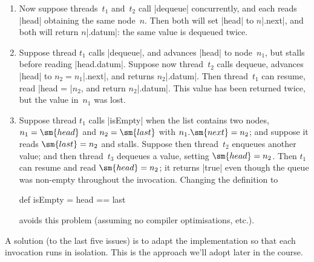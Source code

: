 \begin{answerI}
\begin{enumerate}

\item Now suppose threads~$t_1$ and~$t_2$ call |dequeue| concurrently, and
  each reads |head| obtaining the same node~$n$.  Then both will set |head| to
  $n$|.next|, and both will return $n$|.datum|: the same value is dequeued
  twice.


\item Suppose thread $t_1$ calls |dequeue|, and advances |head| to node~$n_1$,
  but stalls before reading |head.datum|.  Suppose now thread~$t_2$ calls
  dequeue, advances |head| to $n_2 = n_1$|.next|, and returns $n_2$|.datum|.
  Then thread~$t_1$ can resume, read |head = |$n_2$, and
  return $n_2$|.datum|.  This value has been returned twice, but the value
  in~$n_1$ was lost. 

\item Suppose thread $t_1$ calls |isEmpty| when the list contains two nodes,
  $n_1 = \sm{head}$ and $n_2 = \sm{last}$ with $n_1.\sm{next} = n_2$; and
  suppose it reads $\sm{last} = n_2$ and stalls.  Suppose then thread~$t_2$
  enqueues another value; and then thread~$t_3$ dequeues a value, setting
  $\sm{head} = n_2$.  Then $t_1$ can resume and read $\sm{head} = n_2$; it
  returns |true| even though the queue was non-empty throughout the
  invocation. 
%
  Changing the definition to
  \begin{scala}
  def isEmpty = head == last
  \end{scala}%
  avoids this problem (assuming no compiler optimisations, etc.).
\end{enumerate}

A solution (to the last five issues) is to adapt the implementation so that
each invocation runs in isolation.  This is the approach we'll adopt later in
the course.  
\end{answerI}
